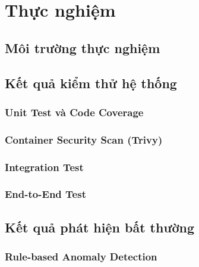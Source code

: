 \section{Thực nghiệm}

\subsection{Môi trường thực nghiệm}


\subsection{Kết quả kiểm thử hệ thống}

\subsubsection{Unit Test và Code Coverage}


\subsubsection{Container Security Scan (Trivy)}


\subsubsection{Integration Test}


\subsubsection{End-to-End Test}


\subsection{Kết quả phát hiện bất thường}

\subsubsection{Rule-based Anomaly Detection}


